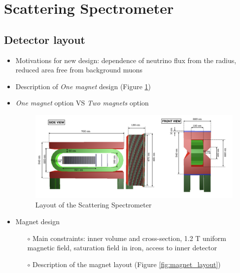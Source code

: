 \section{Scattering Spectrometer}
\label{sec:scatteringspectrometer}

\subsection{Detector layout}

\begin{itemize}
    \item Motivations for new design: dependence of neutrino flux from the radius, reduced area free from background muons 
    \item Description of \emph{One magnet} design (Figure \ref{fig:spectro_layout})
    \item \emph{One magnet} option VS \emph{Two magnets} option


\begin{figure}[htbp]
\centering
\includegraphics[scale=0.35]{figs/ScatteringSpectrometer/ScatteringSpectro.png}
\caption{Layout of the Scattering Spectrometer}
\label{fig:spectro_layout}
\end{figure}

\item Magnet design
 \begin{itemize}
 \item[$\circ$] Main constraints: inner volume and cross-section, 1.2 T uniform magnetic field, saturation field in iron, access to inner detector
 \item[$\circ$] Description of the magnet layout (Figure \ref{fig:magnet_layout})
 \end{itemize}
 


\end{itemize}

